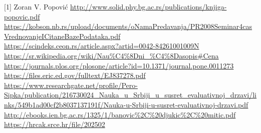 \documentclass[12pt,a4paper]{article}
\begin{document}
    [1] Zoran V. Popović \url{http://www.solid.phy.bg.ac.rs/publications/knjiga-popovic.pdf}\\
    \quad
    [2] \url{https://kobson.nb.rs/upload/documents/oNamaPredavanja/PR2008Seminar4casVrednovanjeICitaneBazePodataka.pdf}\\
    \quad
    [3] \url{https://scindeks.ceon.rs/article.aspx?artid=0042-84261001009N}\\
    \quad
    [4] \url{https://sr.wikipedia.org/wiki/Nau%C4%8Dni_%C4%8Dasopis#Cena}\\
    \quad
    [5] \url{https://journals.plos.org/plosone/article?id=10.1371/journal.pone.0011273}\\
    \quad
    [6] \url {https://files.eric.ed.gov/fulltext/EJ837278.pdf}\\
    \quad
    [7] \url {https://www.researchgate.net/profile/Pero-Sipka/publication/216730024_Nauka_u_Srbiji_u_susret_evaluativnoj_drzavi/links/549b1ad00cf2b8037137191f/Nauka-u-Srbiji-u-susret-evaluativnoj-drzavi.pdf}\\
    \quad
    [8]\url{http://ebooks.ien.bg.ac.rs/1325/1/banovic%2C%20djukic%2C%20mitic.pdf}\\
    \quad
    [9]\url{https://hrcak.srce.hr/file/202502}\\
 \
\end{document}
